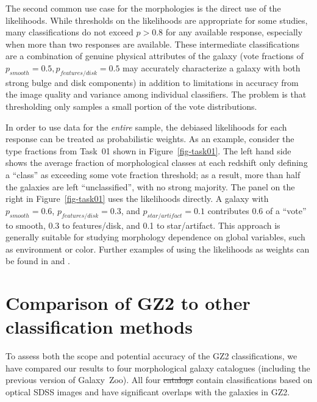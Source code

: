 \documentclass[useAMS,usenatbib]{mn2e}
\providecommand{\DIFaddtex}[1]{{\protect\color{blue}\uwave{#1}}} %
\providecommand{\DIFdeltex}[1]{{\protect\color{red}\sout{#1}}}                      %
\providecommand{\DIFaddbegin}{} %
\providecommand{\DIFaddend}{} %
\providecommand{\DIFdelbegin}{} %
\providecommand{\DIFdelend}{} %
\providecommand{\DIFadd}[1]{\texorpdfstring{\DIFaddtex{#1}}{#1}} %
\providecommand{\DIFdel}[1]{\texorpdfstring{\DIFdeltex{#1}}{}} %
\begin{document}
The second common use case for the morphologies is the direct use of the likelihoods. While thresholds on the likelihoods are appropriate for some studies, many classifications do not exceed $p>0.8$ for any available response, especially when more than two responses are available. These intermediate classifications are a combination of genuine physical attributes of the galaxy (vote fractions of $p_{smooth}=0.5,p_{features/disk}=0.5$ may accurately characterize a galaxy with both strong bulge and disk components) in addition to limitations in accuracy from the image quality and variance among individual classifiers. The problem is that thresholding only samples a small portion of the vote distributions.

In order to use data for the {\it entire} sample, the debiased likelihoods for each response can be treated as probabilistic weights. As an example, consider the type fractions from Task~01 shown in Figure~\ref{fig-task01}. The left hand side shows the average fraction of morphological classes at each redshift only defining a ``class'' as exceeding some vote fraction threshold; as a result, more than half the galaxies are left ``unclassified'', with no strong majority. The panel on the right in Figure~\ref{fig-task01} uses the likelihoods directly. A galaxy with $p_{smooth}=0.6$, $p_{features/disk}=0.3$, and $p_{star/artifact}=0.1$ contributes 0.6 of a ``vote'' to smooth, 0.3 to features/disk, and 0.1 to star/artifact. This approach is generally suitable for studying morphology dependence on global variables, such as environment or color. Further examples of using the likelihoods as weights can be found in \citet{bam09} and \citet{ski12}.


\section{Comparison of GZ2 to other classification methods}\label{sec-comparison}

To assess both the scope and potential accuracy of the GZ2 classifications, we have compared our results to four morphological galaxy catalogues (including the previous version of Galaxy~Zoo). All four \DIFdelbegin \DIFdel{catalogs }\DIFdelend \DIFaddbegin \DIFadd{catalogues }\DIFaddend contain classifications based on optical SDSS images and have significant overlaps with the galaxies in GZ2. 
\end{document}
